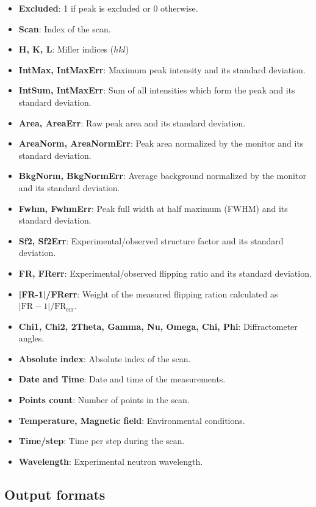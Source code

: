 \begin{itemize}
	\item \textbf{Excluded}: 1 if peak is excluded or 0 otherwise.
	\item \textbf{Scan}: Index of the scan.
	\item \textbf{H, K, L}: Miller indices ($hkl$)
	\item \textbf{IntMax, IntMaxErr}: Maximum peak intensity and its standard deviation.
	\item \textbf{IntSum, IntMaxErr}: Sum of all intensities which form the peak and its standard deviation.
	\item \textbf{Area, AreaErr}: Raw peak area and its standard deviation.
	\item \textbf{AreaNorm, AreaNormErr}: Peak area normalized by the monitor and its standard deviation.
	\item \textbf{BkgNorm, BkgNormErr}: Average background normalized by the monitor and its standard deviation.
	\item \textbf{Fwhm, FwhmErr}: Peak full width at half maximum (FWHM) and its standard deviation.
	\item \textbf{Sf2, Sf2Err}: Experimental/observed structure factor and its standard deviation.
	\item \textbf{FR, FRerr}: Experimental/observed flipping ratio and its standard deviation.
	\item \textbf{|FR-1|/FRerr}: Weight of the measured flipping ration calculated as $|\text{FR}-1|/\text{FR}_\text{err}$.
	\item \textbf{Chi1, Chi2, 2Theta, Gamma, Nu, Omega, Chi, Phi}: Diffractometer angles.
	\item \textbf{Absolute index}: Absolute index of the scan.
	\item \textbf{Date and Time}: Date and time of the measurements.
	\item \textbf{Points count}: Number of points in the scan.
	\item \textbf{Temperature, Magnetic field}: Environmental conditions.
	\item \textbf{Time/step}: Time per step during the scan.
	\item \textbf{Wavelength}: Experimental neutron wavelength.
\end{itemize}

\newpage
\subsection{Output formats}

